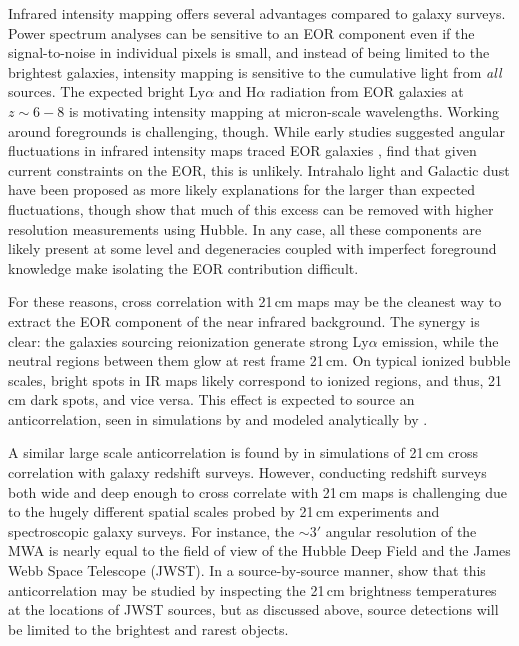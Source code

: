 \documentclass[numberedappendix]{emulateapj}
\begin{document}
Infrared intensity mapping offers several advantages compared to galaxy surveys. Power spectrum analyses can be sensitive to an EOR component even if the signal-to-noise in individual pixels is small, and instead of being limited to the brightest galaxies, intensity mapping is sensitive to the cumulative light from \textit{all} sources. The expected bright Ly$\alpha$ \citep[e.g.][]{primevaltwins} and H$\alpha$ \citep[e.g.][]{brightemissionlines} radiation from EOR galaxies at $z\sim6-8$ is motivating intensity mapping at micron-scale wavelengths. Working around foregrounds is challenging, though. While early studies suggested angular fluctuations in infrared intensity maps traced EOR galaxies \citep[e.g.,][]{kash1,kash2,kash3}, \citet{kash4} find that given current constraints on the EOR, this is unlikely. Intrahalo light \citep{cooray12,zemcov14} and Galactic dust \citep{yue16} have been proposed as more likely explanations for the larger than expected fluctuations, though \citet{mw15} show that much of this excess can be removed with higher resolution measurements using Hubble. In any case, all these components are likely present at some level and degeneracies coupled with imperfect foreground knowledge make isolating the EOR contribution difficult.

For these reasons, cross correlation with 21\,cm maps may be the cleanest way to extract the EOR component of the near infrared background. The synergy is clear: the galaxies sourcing reionization generate strong Ly$\alpha$ emission, while the neutral regions between them glow at rest frame 21\,cm. On typical ionized bubble scales, bright spots in IR maps likely correspond to ionized regions, and thus, 21\,cm dark spots, and vice versa. This effect is expected to source an anticorrelation, seen in simulations by \citet{silva12,Heneka2016} and modeled analytically by \citet{feng17,mao14}.

A similar large scale anticorrelation is found by \citet{lidz09,park14} in simulations of 21\,cm cross correlation with galaxy redshift surveys. However, conducting redshift surveys both wide and deep enough to cross correlate with 21\,cm maps is challenging due to the hugely different spatial scales probed by 21\,cm experiments and spectroscopic galaxy surveys. For instance, the $\sim3'$ angular resolution of the MWA is nearly equal to the field of view of the Hubble Deep Field and the James Webb Space Telescope (JWST). In a source-by-source manner, \citep{beardsley15} show that this anticorrelation may be studied by inspecting the 21\,cm brightness temperatures at the locations of JWST sources, but as discussed above, source detections will be limited to the brightest and rarest objects.
\end{document}
